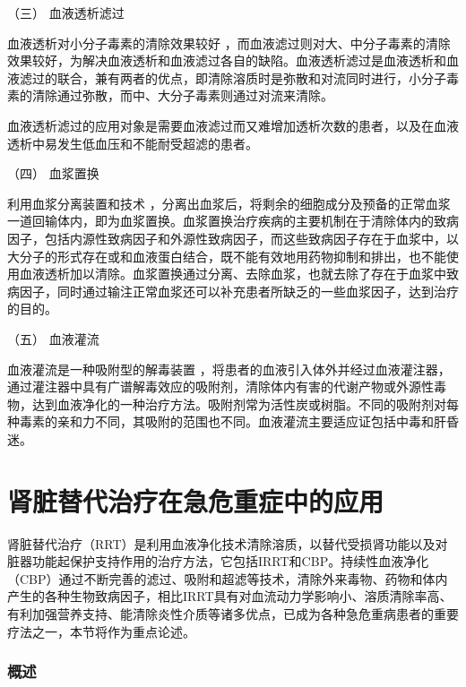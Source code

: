 \hypertarget{text00390.htmlux5cux23CHP16-10-1-3-3}{}
（三） 血液透析滤过

血液透析对小分子毒素的清除效果较好
，而血液滤过则对大、中分子毒素的清除效果较好，为解决血液透析和血液滤过各自的缺陷。血液透析滤过是血液透析和血液滤过的联合，兼有两者的优点，即清除溶质时是弥散和对流同时进行，小分子毒素的清除通过弥散，而中、大分子毒素则通过对流来清除。

血液透析滤过的应用对象是需要血液滤过而又难增加透析次数的患者，以及在血液透析中易发生低血压和不能耐受超滤的患者。

\hypertarget{text00390.htmlux5cux23CHP16-10-1-3-4}{}
（四） 血浆置换

利用血浆分离装置和技术
，分离出血浆后，将剩余的细胞成分及预备的正常血浆一道回输体内，即为血浆置换。血浆置换治疗疾病的主要机制在于清除体内的致病因子，包括内源性致病因子和外源性致病因子，而这些致病因子存在于血浆中，以大分子的形式存在或和血液蛋白结合，既不能有效地用药物抑制和排出，也不能使用血液透析加以清除。血浆置换通过分离、去除血浆，也就去除了存在于血浆中致病因子，同时通过输注正常血浆还可以补充患者所缺乏的一些血浆因子，达到治疗的目的。

\hypertarget{text00390.htmlux5cux23CHP16-10-1-3-5}{}
（五） 血液灌流

血液灌流是一种吸附型的解毒装置
，将患者的血液引入体外并经过血液灌注器，通过灌注器中具有广谱解毒效应的吸附剂，清除体内有害的代谢产物或外源性毒物，达到血液净化的一种治疗方法。吸附剂常为活性炭或树脂。不同的吸附剂对每种毒素的亲和力不同，其吸附的范围也不同。血液灌流主要适应证包括中毒和肝昏迷。

\protect\hypertarget{text00391.html}{}{}

\section{肾脏替代治疗在急危重症中的应用}

肾脏替代治疗（RRT）是利用血液净化技术清除溶质，以替代受损肾功能以及对脏器功能起保护支持作用的治疗方法，它包括IRRT和CBP。持续性血液净化（CBP）通过不断完善的滤过、吸附和超滤等技术，清除外来毒物、药物和体内产生的各种生物致病因子，相比IRRT具有对血流动力学影响小、溶质清除率高、有利加强营养支持、能清除炎性介质等诸多优点，已成为各种急危重病患者的重要疗法之一，本节将作为重点论述。

\subsubsection{概述}

